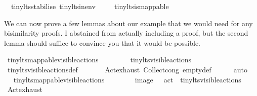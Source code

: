 \begin{isabellebody}
\ \ tiny{\isacharunderscore}{\kern0pt}lts{\isachardot}{\kern0pt}stabilise\ tiny{\isacharunderscore}{\kern0pt}lts{\isachardot}{\kern0pt}in{\isacharunderscore}{\kern0pt}env\ \isanewline
\ \ \isamarkupfalse%
\ tiny{\isacharunderscore}{\kern0pt}lts{\isachardot}{\kern0pt}is{\isacharunderscore}{\kern0pt}mappable\ \isacommand{{\isachardot}{\kern0pt}}\isamarkupfalse%
\isanewline
%
\isanewline
%
\endisatagvisible
{\isafoldvisible}%
%
\isadelimvisible
%
\endisadelimvisible
%
\begin{isamarkuptext}%
We can now prove a few lemmas about our example \LTSt{} that we would need for any bisimilarity proofs. I abstained from actually including a proof, but the second lemma should suffice to convince you that it would be possible.%
\end{isamarkuptext}\isamarkuptrue%
%
\isadelimvisible
%
\endisadelimvisible
%
\isatagvisible
{}\isamarkupfalse%
\ {\isacartoucheopen}tiny{\isacharunderscore}{\kern0pt}lts{\isacharunderscore}{\kern0pt}mappable{\isachardot}{\kern0pt}visible{\isacharunderscore}{\kern0pt}actions\ {\isacharequal}{\kern0pt}\ {\isasymemptyset}{\isacartoucheclose}\ \isanewline
{}\isamarkupfalse%
\ {\isacharminus}{\kern0pt}\isanewline
\ \ \isamarkupfalse%
\ {\isacartoucheopen}tiny{\isacharunderscore}{\kern0pt}lts{\isachardot}{\kern0pt}visible{\isacharunderscore}{\kern0pt}actions\ {\isacharequal}{\kern0pt}\ {\isasymemptyset}{\isacartoucheclose}\isanewline
\ \ \ \ \isamarkupfalse%
\ tiny{\isacharunderscore}{\kern0pt}lts{\isachardot}{\kern0pt}visible{\isacharunderscore}{\kern0pt}actions{\isacharunderscore}{\kern0pt}def\ \isanewline
\ \ \ \ \ \ Act{\isachardot}{\kern0pt}exhaust\ Collect{\isacharunderscore}{\kern0pt}cong\ empty{\isacharunderscore}{\kern0pt}def\isanewline
\ \ \ \ \isamarkupfalse%
\ auto\isanewline
\ \ \isamarkupfalse%
\ \isamarkupfalse%
\ {\isacartoucheopen}tiny{\isacharunderscore}{\kern0pt}lts{\isacharunderscore}{\kern0pt}mappable{\isachardot}{\kern0pt}visible{\isacharunderscore}{\kern0pt}actions\ \isanewline
\ \ \ \ \ \ {\isacharequal}{\kern0pt}\ image\ {\isacharparenleft}{\kern0pt}{\isasymlambda}\ {\isasymalpha}{\isachardot}{\kern0pt}\ act\ {\isasymalpha}{\isacharparenright}{\kern0pt}\ tiny{\isacharunderscore}{\kern0pt}lts{\isachardot}{\kern0pt}visible{\isacharunderscore}{\kern0pt}actions{\isacartoucheclose}\isanewline
\ \ \ \ \isamarkupfalse%
\ Act{\isachardot}{\kern0pt}exhaust\ \isanewline

\end{isabellebody}
